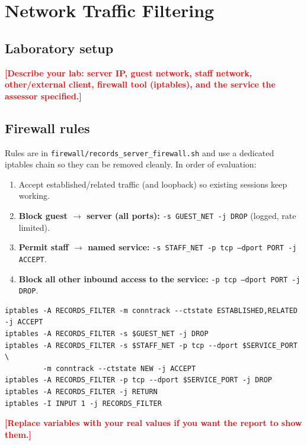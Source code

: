 \documentclass[11pt,a4paper]{article}
\newcommand{\todo}[1]{\textcolor{red}{\textbf{[#1]}}}
\begin{document}
\section{Network Traffic Filtering}
\subsection{Laboratory setup}
\todo{Describe your lab: server IP, guest network, staff network, other/external client, firewall tool (iptables), and the service the assessor specified.}

\subsection{Firewall rules}
Rules are in \texttt{firewall/records\_server\_firewall.sh} and use a dedicated iptables chain so they can be removed cleanly.
In order of evaluation:
\begin{enumerate}[nosep]
  \item Accept established/related traffic (and loopback) so existing sessions keep working.
  \item \textbf{Block guest $\rightarrow$ server (all ports):} \texttt{-s GUEST\_NET -j DROP} (logged, rate limited).
  \item \textbf{Permit staff $\rightarrow$ named service:} \texttt{-s STAFF\_NET -p tcp --dport PORT -j ACCEPT}.
  \item \textbf{Block all other inbound access to the service:} \texttt{-p tcp --dport PORT -j DROP}.
\end{enumerate}
\begin{lstlisting}
iptables -A RECORDS_FILTER -m conntrack --ctstate ESTABLISHED,RELATED -j ACCEPT
iptables -A RECORDS_FILTER -s $GUEST_NET -j DROP
iptables -A RECORDS_FILTER -s $STAFF_NET -p tcp --dport $SERVICE_PORT \
         -m conntrack --ctstate NEW -j ACCEPT
iptables -A RECORDS_FILTER -p tcp --dport $SERVICE_PORT -j DROP
iptables -A RECORDS_FILTER -j RETURN
iptables -I INPUT 1 -j RECORDS_FILTER
\end{lstlisting}
\todo{Replace variables with your real values if you want the report to show them.}
\end{document}
